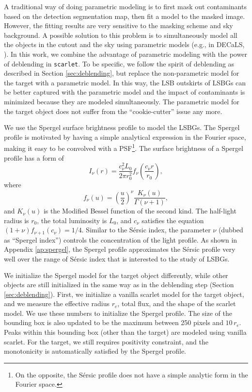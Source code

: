 \documentclass[twocolumn,astrosymb,twocolappendix]{aastex631}
\newcommand{\code}[1]{\texttt{#1}}
\newcommand{\sersic}{S\'ersic}
\begin{document}
\begin{CJK*}{UTF8}{gbsn}
A traditional way of doing parametric modeling is to first mask out contaminants based on the detection segmentation map, then fit a model to the masked image. However, the fitting results are very sensitive to the masking scheme \citep[e.g.,][]{Greco2018} and sky background. A possible solution to this problem is to simultaneously model all the objects in the cutout and the sky using parametric models (e.g., in DECaLS, \citealt{Dey2019}). In this work, we combine the advantage of parametric modeling with the power of deblending in \code{scarlet}. To be specific, we follow the spirit of deblending as described in Section \ref{sec:deblending}, but replace the non-parametric model for the target with a parametric model. In this way, the LSB outskirts of LSBGs can be better captured with the parametric model and the impact of contaminants is minimized because they are modeled simultaneously. The parametric model for the target object does not suffer from the ``cookie-cutter'' issue any more. 

We use the Spergel surface brightness profile \citep{Spergel2010} to model the LSBGs. The Spergel profile is motivated by having a simple analytical expression in the Fourier space, making it easy to be convolved with a PSF\footnote{On the opposite, the \sersic{} profile does not have a simple analytic form in the Fourier space.}. The surface brightness of a Spergel profile has a form of
\begin{equation}
    \label{eq:spergel}
    I_\nu(r) = \frac{c_{\nu}^{2} L_{0}}{2\pi r_{0}^{2}} f_{\nu}\left(\frac{c_{\nu} r}{r_{0}}\right),
\end{equation}
where 
\begin{equation}
    f_{\nu}(u)=\left(\frac{u}{2}\right)^{\nu} \frac{K_{\nu}(u)}{\Gamma(\nu+1)},
\end{equation}
and $K_\nu(u)$ is the Modified Bessel function of the second kind. The half-light radius is $r_0$, the total luminosity is $L_0$, and $c_\nu$ satisfies the equation $(1 + \nu)f_{\nu + 1}(c_\nu) = 1/4$. Similar to the \sersic{} index, the parameter $\nu$ (dubbed as ``Spergel index'') controls the concentration of the light profile. As shown in Appendix \ref{ap:spergel}, the Spergel profile approximates the \sersic{} profile very well over the range of \sersic{} index that is interested to the study of LSBGs.

We initialize the Spergel model for the target object differently, while other objects are still initialized in the same way as in the deblending step (Section \ref{sec:deblending}). First, we initialize a vanilla scarlet model for the target object, and we measure the effective radius $r_e$, total flux, and the shape of the scarlet model. We use these numbers to initialize the Spergel profile. The size of the bounding box is also updated to be the maximum between 250 pixels and $10\, r_e$. Peaks within this bounding box (other than the target) are modeled using vanilla scarlet. For the target, we still requires positivity constraint, and the monotonicity is automatically satisfied by the Spergel profile. 


\end{CJK*}
\end{document}
